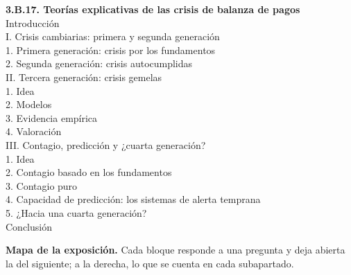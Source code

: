 \documentclass[11pt]{article}
\begin{document}
\begin{esquema}[unbreakable]
\textbf{3.B.17. Teorías explicativas de las crisis de balanza de pagos}\\[2pt]
Introducción\\
I. Crisis cambiarias: primera y segunda generación\\
\hspace*{1.5em}1. Primera generación: crisis por los fundamentos\\
\hspace*{1.5em}2. Segunda generación: crisis autocumplidas\\
II. Tercera generación: crisis gemelas\\
\hspace*{1.5em}1. Idea\\
\hspace*{1.5em}2. Modelos\\
\hspace*{1.5em}3. Evidencia empírica\\
\hspace*{1.5em}4. Valoración\\
III. Contagio, predicción y ¿cuarta generación?\\
\hspace*{1.5em}1. Idea\\
\hspace*{1.5em}2. Contagio basado en los fundamentos\\
\hspace*{1.5em}3. Contagio puro\\
\hspace*{1.5em}4. Capacidad de predicción: los sistemas de alerta temprana\\
\hspace*{1.5em}5. ¿Hacia una cuarta generación?\\
Conclusión
\end{esquema}

\begin{anotaciones}
\textbf{Mapa de la exposición.} Cada bloque responde a una pregunta y deja abierta la del siguiente; a la derecha, lo que se cuenta en cada subapartado.
\begin{infografiacaja}
\caption{Mapa del tema: la pregunta de cada bloque, sus subapartados y el hilo que los une}\label{figu:mapa-tema}
\end{infografiacaja}
\end{anotaciones}
\end{document}
